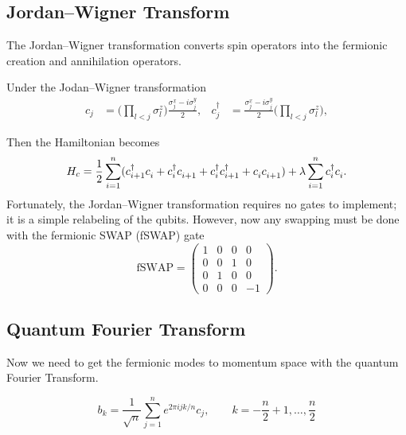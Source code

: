 \documentclass[12pt]{article}
\newcommand*{\eu}{e}
\newcommand*{\iu}{i}
\begin{document}
  \subsection{Jordan--Wigner Transform}
  The Jordan--Wigner transformation converts spin operators into the fermionic creation and annihilation operators.

  Under the Jodan--Wigner transformation
  \begin{align}
    \label{eq:jordan-wigner}
    c_{j}
      &= \biggl( \prod_{l < j} \sigma_{l}^{z} \biggr)
         \frac{\sigma_{j}^{x} - \iu \sigma_{j}^{y}}{2},
    &
    c_{j}^{\dagger}
      &= \frac{\sigma^{x}_{j} - \iu \sigma^{y}_{j}}{2}
         \biggl( \prod_{l < j} \sigma^{z}_{l} \biggr),
  \end{align}

  Then the Hamiltonian becomes
  \begin{equation}
    \label{eq:hamiltonian-fermion}
    H_{c}
      = \frac{1}{2}
        \sum_{i = 1}^{n} (c_{i + 1}^{\dagger} c_{i}^{\vphantom{\dagger}}
                          + c_{i}^{\dagger} c_{i + 1}^{\vphantom{\dagger}}
                          + c_{i}^{\dagger} c_{i + 1}^{\dagger}
                          + c_{i}^{\vphantom{\dagger}}
                            c_{i + 1}^{\vphantom{\dagger}})
        + \lambda \sum_{i = 1}^{n} c_{i}^{\dagger} c_{i}^{\vphantom{\dagger}}.
  \end{equation}
  Fortunately, the Jordan--Wigner transformation requires no gates to implement; it is a simple relabeling of the qubits. However, now any swapping must be done with the fermionic SWAP (fSWAP) gate
  \begin{equation}
    \label{eq:fswap}
    \mathrm{fSWAP}
      = \begin{pmatrix}
          1 & 0 & 0 & 0 \\
          0 & 0 & 1 & 0 \\
          0 & 1 & 0 & 0 \\
          0 & 0 & 0 & -1
        \end{pmatrix}.
  \end{equation}

  \subsection{Quantum Fourier Transform}
  Now we need to get the fermionic modes to momentum space with the quantum Fourier Transform.

  \begin{equation}
    \label{eq:qft}
    b_{k}
      = \frac{1}{\sqrt{n}}
        \sum_{j = 1}^{n} \eu^{2 \pi \iu j k / n} c_{j}, \qquad
    k = -\frac{n}{2} + 1, \dotsc, \frac{n}{2}
  \end{equation}
\end{document}
